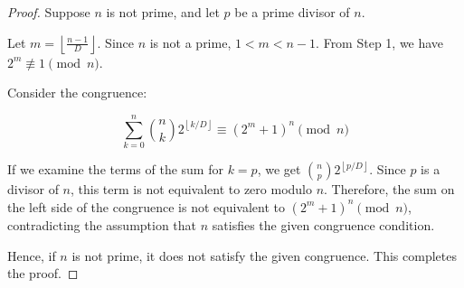 \documentclass{article}
\begin{document}
\begin{proof}
Suppose $n$ is not prime, and let $p$ be a prime divisor of $n$. 

Let $m = \left\lfloor \frac{n-1}{D} \right\rfloor$. Since $n$ is not a prime, $1 < m < n-1$. From Step 1, we have $2^m \not\equiv 1 \pmod{n}$.

Consider the congruence:

$$\sum_{k=0}^{n} \binom{n}{k}2^{\left\lfloor k/D \right\rfloor} \equiv (2^m + 1)^n \pmod{n}$$

If we examine the terms of the sum for $k=p$, we get $\binom{n}{p}2^{\left\lfloor p/D \right\rfloor}$. Since $p$ is a divisor of $n$, this term is not equivalent to zero modulo $n$. Therefore, the sum on the left side of the congruence is not equivalent to $(2^m + 1)^n \pmod{n}$, contradicting the assumption that $n$ satisfies the given congruence condition.

Hence, if $n$ is not prime, it does not satisfy the given congruence. This completes the proof.
\end{proof}
\end{document}
